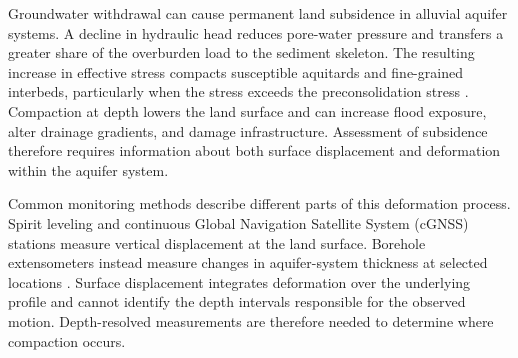 Groundwater withdrawal can cause permanent land subsidence in alluvial aquifer systems. A decline in hydraulic head reduces pore-water pressure and transfers a greater share of the overburden load to the sediment skeleton. The resulting increase in effective stress compacts susceptible aquitards and fine-grained interbeds, particularly when the stress exceeds the preconsolidation stress \citep{galloway_land_1999, herrera-garcia_mapping_2021}. Compaction at depth lowers the land surface and can increase flood exposure, alter drainage gradients, and damage infrastructure. Assessment of subsidence therefore requires information about both surface displacement and deformation within the aquifer system.

Common monitoring methods describe different parts of this deformation process. Spirit leveling and continuous Global Navigation Satellite System (cGNSS) stations measure vertical displacement at the land surface. Borehole extensometers instead measure changes in aquifer-system thickness at selected locations \citep{poland_guidebook_1984, hung2012_mlcw}. Surface displacement integrates deformation over the underlying profile and cannot identify the depth intervals responsible for the observed motion. Depth-resolved measurements are therefore needed to determine where compaction occurs.


